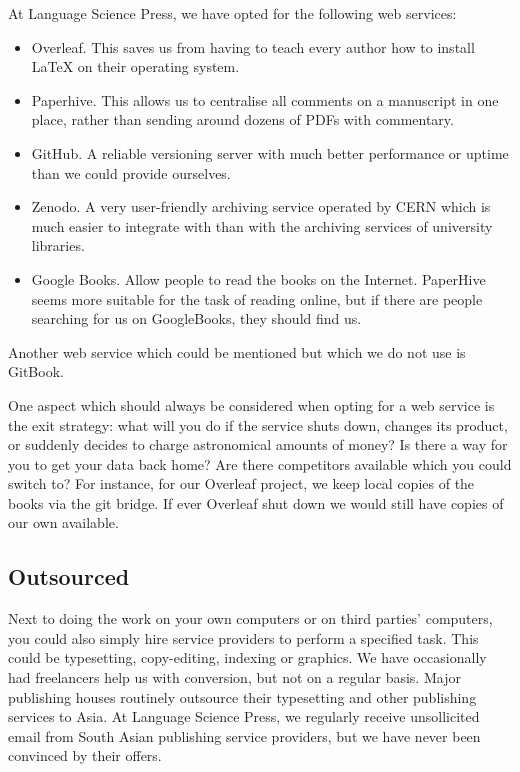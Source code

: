 \documentclass[nonflat,smallfont
]{langsci/langscibook}
\begin{document}
At Language Science Press, we have opted for the following web services: 

\begin{itemize}
 \item Overleaf. This saves us from having to teach every author how to install \LaTeX\xspace on their operating system. 
 \item Paperhive. This allows us to centralise all comments on a manuscript in one place, rather than sending around dozens of PDFs with commentary. 
 \item GitHub. A reliable versioning server with much better performance or uptime than we could provide ourselves. 
 \item Zenodo. A very user-friendly archiving service operated by CERN which is much easier to integrate with than with the archiving services of university libraries.
 \item Google Books. Allow people to read the books on the Internet. PaperHive seems more suitable for the task of reading online, but if there are people searching for us on GoogleBooks, they should find us. 
\end{itemize}

Another web service which could be mentioned but which we do not use is GitBook. 

One aspect which should always be considered when opting for a web service is the exit strategy: what will you do if the service shuts down, changes its product, or suddenly decides to charge astronomical amounts of money? Is there a way for you to get your data back home? Are there competitors available which you could switch to? For instance, for our Overleaf project, we keep local copies of the books via the git bridge. If ever Overleaf shut down we would still have copies of our own available. 

\subsection{Outsourced}
Next to doing the work on your own computers or on third parties' computers, you could also simply hire service providers to perform a specified task. This could be typesetting, copy-editing, indexing or graphics. We have occasionally had freelancers help us with conversion, but not on a regular basis. Major publishing houses routinely outsource their typesetting and other publishing services to Asia. At Language Science Press, we regularly receive unsollicited email from South Asian publishing service providers, but we have never been convinced by their offers. 
            
\end{document}
